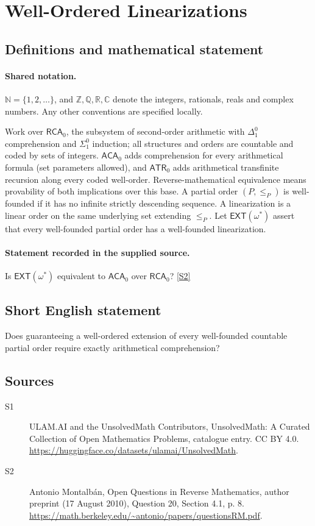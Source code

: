\documentclass[11pt]{article}
\newcommand{\sref}[2]{\hyperlink{source:#1:#2}{[S#2]}}
\begin{document}
\section{Well-Ordered Linearizations}\label{statement}

\subsection{Definitions and mathematical statement}

\paragraph{Shared notation.}$\mathbb N=\{1,2,\ldots\}$, and $\mathbb Z,\mathbb Q,\mathbb R,\mathbb C$ denote the integers, rationals, reals and complex numbers. Any other conventions are specified locally.


Work over $\mathsf{RCA}_0$, the subsystem of second-order arithmetic with $\Delta^0_1$ comprehension and $\Sigma^0_1$ induction; all structures and orders are countable and coded by sets of integers. $\mathsf{ACA}_0$ adds comprehension for every arithmetical formula (set parameters allowed), and $\mathsf{ATR}_0$ adds arithmetical transfinite recursion along every coded well-order. Reverse-mathematical equivalence means provability of both implications over this base. A partial order $(P,\le_P)$ is well-founded if it has no infinite strictly descending sequence. A linearization is a linear order on the same underlying set extending $\le_P$. Let $\mathsf{EXT}(\omega^*)$ assert that every well-founded partial order has a well-founded linearization.
\paragraph{Statement recorded in the supplied source.}
Is $\mathsf{EXT}(\omega^*)$ equivalent to $\mathsf{ACA}_0$ over $\mathsf{RCA}_0$? \sref{statement}{2}
\subsection{Short English statement}
Does guaranteeing a well-ordered extension of every well-founded countable partial order require exactly arithmetical comprehension?
\subsection{Sources}
\begin{description}
\item[\hypertarget{source:statement:1}{S1}] ULAM.AI and the UnsolvedMath Contributors, UnsolvedMath: A Curated Collection of Open Mathematics Problems, catalogue entry. CC BY 4.0. \url{https://huggingface.co/datasets/ulamai/UnsolvedMath}.
\item[\hypertarget{source:statement:2}{S2}] Antonio Montalbán, Open Questions in Reverse Mathematics, author preprint (17 August 2010), Question 20, Section 4.1, p. 8. \url{https://math.berkeley.edu/~antonio/papers/questionsRM.pdf}.
\end{description}
\label{end:statement}
\end{document}
